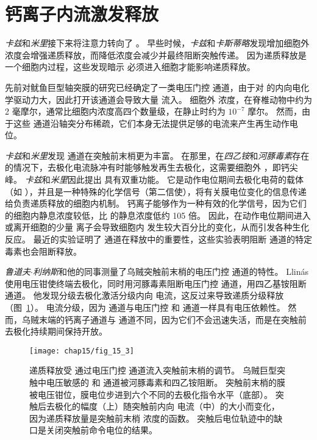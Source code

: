 \section{钙离子内流激发释放}

\textit{卡兹}和\textit{米里}接下来将注意力转向了 。
早些时候，\textit{卡兹}和\textit{卡斯蒂略}发现增加细胞外  浓度会增强递质释放，而降低浓度会减少并最终阻断突触传递。
因为递质释放是一个细胞内过程，这些发现暗示  必须进入细胞才能影响递质释放。


先前对鱿鱼巨型轴突膜的研究已经确定了一类电压门控  通道，由于对  的内向电化学驱动力大，因此打开该通道会导致大量  流入。
细胞外  浓度，在脊椎动物中约为 2 毫摩尔，通常比细胞内浓度高四个数量级，在静止时约为 $10^{-7}$ 摩尔。
然而，由于这些  通道沿轴突分布稀疏，它们本身无法提供足够的电流来产生再生动作电位。


\textit{卡兹}和\textit{米里}发现  通道在突触前末梢更为丰富。
在那里，在\textit{四乙铵}和\textit{河豚毒素}存在的情况下，去极化电流脉冲有时能够触发再生去极化，这需要细胞外 ，即钙尖峰。
\textit{卡兹}和\textit{米里}因此提出  具有双重功能。
它是动作电位期间去极化电荷的载体（如 ），并且是一种特殊的化学信号（第二信使），将有关膜电位变化的信息传递给负责递质释放的细胞内机制。
钙离子能够作为一种有效的化学信号，因为它们的细胞内静息浓度较低，比  的静息浓度低约 105 倍。
因此，在动作电位期间进入或离开细胞的少量  离子会导致细胞内  发生较大百分比的变化，从而引发各种生化反应。
最近的实验证明了  通道在释放中的重要性，这些实验表明阻断  通道的特定毒素也会阻断释放。


\textit{鲁道夫$\cdot$利纳斯}和他的同事测量了乌贼突触前末梢的电压门控  通道的特性。
Llinás 使用电压钳使终端去极化，同时用河豚毒素阻断电压门控  通道，用四乙基铵阻断  通道。
他发现分级去极化激活分级内向  电流，这反过来导致递质分级释放（图~\ref{fig:15_3}）。
 电流分级，因为  通道与电压门控  和  通道一样具有电压依赖性。
然而，乌贼末端的钙离子通道与  通道不同，因为它们不会迅速失活，而是在突触前去极化持续期间保持开放。


\begin{figure}[htbp]
	\centering
	\texttt{[image: chap15/fig\_15\_3]}
	\caption{递质释放受  通过电压门控  通道流入突触前末梢的调节。
	乌贼巨型突触中电压敏感的  和  通道被河豚毒素和四乙铵阻断。
	突触前末梢的膜被电压钳位，膜电位步进到六个不同的去极化指令水平（底部）。
	突触后去极化的幅度（上）随突触前内向  电流（中）的大小而变化，因为递质释放量是突触前末梢  浓度的函数。
	突触后电位轨迹中的缺口是关闭突触前命令电位的结果\cite{llinas1977depolarization}。}
	\label{fig:15_3}
\end{figure}


